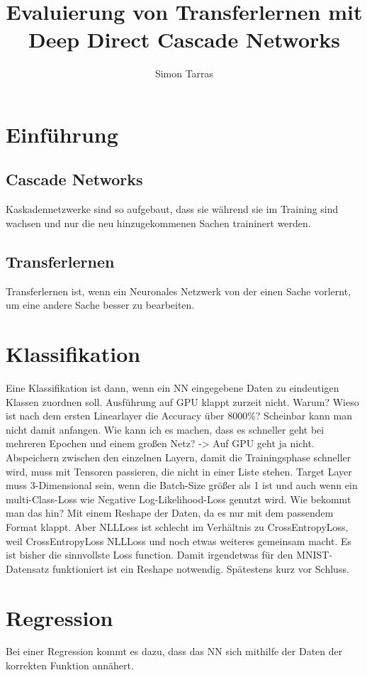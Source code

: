 \documentclass[ngerman]{report}
\title{Evaluierung von Transferlernen mit Deep Direct Cascade Networks}
\author{Simon Tarras}
\begin{document}
    \maketitle
    \chapter{Einführung}
        \section{Cascade Networks}
        Kaskadennetzwerke sind so aufgebaut, dass sie während sie 
        im Training sind wachsen und nur die neu hinzugekommenen 
        Sachen traininert werden.
        \section{Transferlernen}
        Transferlernen ist, wenn ein Neuronales Netzwerk von der 
        einen Sache vorlernt, um eine andere Sache besser zu 
        bearbeiten.
    \chapter{Klassifikation}
    Eine Klassifikation ist dann, wenn ein NN eingegebene Daten zu 
    eindeutigen Klassen zuordnen soll.
    Ausführung auf GPU klappt zurzeit nicht. Warum?
    Wieso ist nach dem ersten Linearlayer die Accuracy über 8000\%?
    Scheinbar kann man nicht damit anfangen.
    Wie kann ich es machen, dass es schneller geht bei mehreren Epochen 
    und einem großen Netz? -> Auf GPU geht ja nicht.
    Abspeichern zwischen den einzelnen Layern, damit die Trainingsphase 
    schneller wird, muss mit Tensoren passieren, die nicht in einer Liste 
    stehen. 
    Target Layer muss 3-Dimensional sein, wenn die Batch-Size größer als 1 
    ist und auch wenn ein multi-Class-Loss wie Negative Log-Likelihood-Loss 
    genutzt wird. Wie bekommt man das hin?
    Mit einem Reshape der Daten, da es nur mit dem passendem Format klappt. 
    Aber NLLLoss ist schlecht im Verhältnis zu CrossEntropyLoss, weil 
    CrossEntropyLoss NLLLoss und noch etwas weiteres gemeinsam macht.
    Es ist bisher die sinnvollste Loss function.
    Damit irgendetwas für den MNIST-Datensatz funktioniert ist ein 
    Reshape notwendig. Spätestens kurz vor Schluss.
    \chapter{Regression}
    Bei einer Regression kommt es dazu, dass das NN sich mithilfe 
    der Daten der korrekten Funktion annähert.
\end{document}
